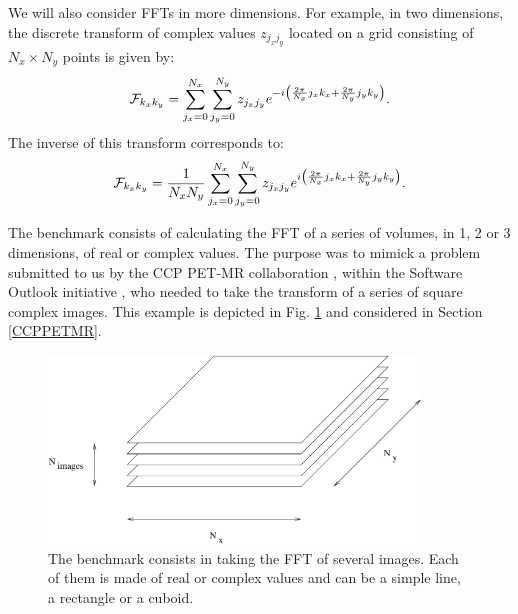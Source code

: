 \documentclass[12pt, a4paper]{article}
\begin{document}
We will also consider FFTs in more dimensions. For example, in two dimensions, the discrete transform of complex values $z_{j_x j_y}$ located on a grid consisting of $N_x \times N_y$ points is given by:\\
$$
{\cal F}_{k_x k_y}=\sum_{j_x=0}^{N_x} \sum_{j_y=0}^{N_y} z_{j_x j_y} e^{-i\left(\frac{2\pi}{N_x} j_x k_x+\frac{2\pi}{N_y} j_y k_y\right)}.
$$
The inverse of this transform corresponds to:
$$
{\cal F}_{k_x k_y}=\frac{1}{N_xN_y}\sum_{j_x=0}^{N_x} \sum_{j_y=0}^{N_y} z_{j_x j_y} e^{i\left(\frac{2\pi}{N_x} j_x k_x+\frac{2\pi}{N_y} j_y k_y\right)}.
$$
  


The benchmark \cite{code} consists of calculating the FFT of a series of volumes, in 1, 2 or 3 dimensions, of real or complex values. The purpose was to mimick a problem submitted to us by the CCP PET-MR collaboration \cite{ccppetmr}, within the Software Outlook initiative \cite{softwareoutlook}, who needed to take the transform of a series of square complex images. This example is depicted in Fig. \ref{benchmark} and considered in Section \ref{CCPPETMR}.\\

\begin{figure}[H]
\captionsetup{width=0.6\textwidth}
\centering
\includegraphics[height=5cm]{benchmark.pdf}
\caption{The benchmark consists in taking the FFT of several images. Each of them is made of real or complex values and can be a simple line, a rectangle or a cuboid.}
\label{benchmark}
\end{figure}
\end{document}
